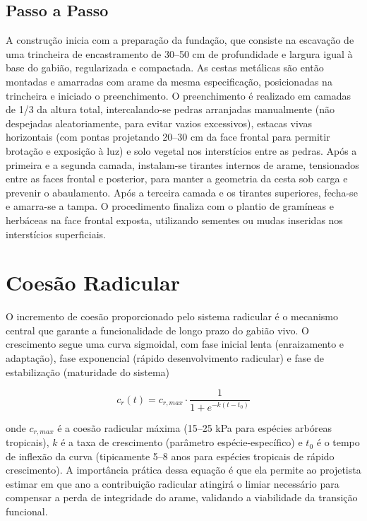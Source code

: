 \documentclass[
  portuguese,
  11pt,
  a4paper,
  open=any]{scrbook}
\begin{document}
\subsection{Passo a Passo}\label{passo-a-passo-1}

A construção inicia com a preparação da fundação, que consiste na
escavação de uma trincheira de encastramento de 30--50 cm de
profundidade e largura igual à base do gabião, regularizada e
compactada. As cestas metálicas são então montadas e amarradas com arame
da mesma especificação, posicionadas na trincheira e iniciado o
preenchimento. O preenchimento é realizado em camadas de 1/3 da altura
total, intercalando-se pedras arranjadas manualmente (não despejadas
aleatoriamente, para evitar vazios excessivos), estacas vivas
horizontais (com pontas projetando 20--30 cm da face frontal para
permitir brotação e exposição à luz) e solo vegetal nos interstícios
entre as pedras. Após a primeira e a segunda camada, instalam-se
tirantes internos de arame, tensionados entre as faces frontal e
posterior, para manter a geometria da cesta sob carga e prevenir o
abaulamento. Após a terceira camada e os tirantes superiores, fecha-se e
amarra-se a tampa. O procedimento finaliza com o plantio de gramíneas e
herbáceas na face frontal exposta, utilizando sementes ou mudas
inseridas nos interstícios superficiais.

\section{Coesão Radicular}\label{coesuxe3o-radicular}

O incremento de coesão proporcionado pelo sistema radicular é o
mecanismo central que garante a funcionalidade de longo prazo do gabião
vivo. O crescimento segue uma curva sigmoidal, com fase inicial lenta
(enraizamento e adaptação), fase exponencial (rápido desenvolvimento
radicular) e fase de estabilização (maturidade do sistema)

\[
c_r(t) = c_{r,max} \cdot \frac{1}{1 + e^{-k(t - t_0)}}
\]

onde \(c_{r,max}\) é a coesão radicular máxima (15--25 kPa para espécies
arbóreas tropicais), \(k\) é a taxa de crescimento (parâmetro
espécie-específico) e \(t_0\) é o tempo de inflexão da curva
(tipicamente 5--8 anos para espécies tropicais de rápido crescimento). A
importância prática dessa equação é que ela permite ao projetista
estimar em que ano a contribuição radicular atingirá o limiar necessário
para compensar a perda de integridade do arame, validando a viabilidade
da transição funcional.
\end{document}
